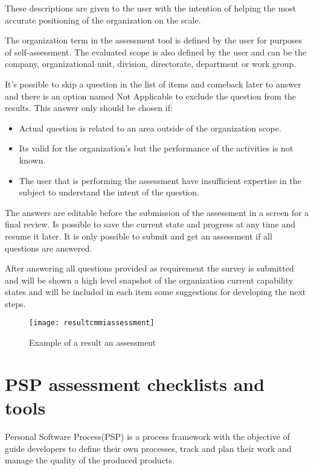 These descriptions are given to the user with the intention of helping the most accurate positioning of the organization on the scale.

The organization term in the assessment tool is defined by the user for purposes of  self-assessment. The evaluated scope is also defined by the user and can be the company, organizational unit, division, directorate, department or work group.

It's possible to skip a question in the list of items and comeback later to answer and there is an option named Not Applicable to exclude the question from the results. This answer only should be chosen if:
\begin{itemize}
	\item Actual question is related to an area outside of the organization scope.
	\item Its valid for the organization's but the  performance of the activities is not known.
	\item The user that is performing the assessment have insufficient expertise in the subject to understand the intent of the question.
\end{itemize}

The answers are editable before the submission of the assessment in a screen for a final review. Is possible to save the current state and progress at any time and resume it later. It is only possible to submit and get an assessment if all questions are answered.

After answering all questions provided as requirement the survey is submitted and will be shown a high level snapshot of the organization  current capability states and will be included in each item some suggestions for developing the next steps.

\newpage

\begin{figure}[h]
	\begin{center}
		\leavevmode
		\texttt{[image: resultcmmiassessment]}
		\caption{Example of a result an assessment}
		\label{fig:assesment_result}
	\end{center}
\end{figure}


\section{PSP assessment checklists and tools}

Personal Software Process(PSP) \citep{humphrey2005psp} is a process framework with the objective of guide developers to define their own processes, track and plan their work and manage the quality of the produced products.


